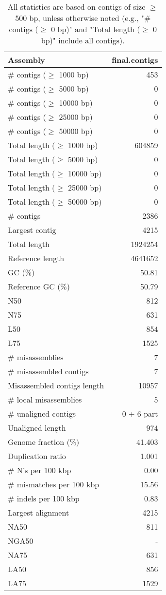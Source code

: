 \documentclass[12pt,a4paper]{article}
\begin{document}
\begin{table}[ht]
\begin{center}
\caption{All statistics are based on contigs of size $\geq$ 500 bp, unless otherwise noted (e.g., "\# contigs ($\geq$ 0 bp)" and "Total length ($\geq$ 0 bp)" include all contigs).}
\begin{tabular}{|l*{1}{|r}|}
\hline
Assembly & final.contigs \\ \hline
\# contigs ($\geq$ 1000 bp) & 453 \\ \hline
\# contigs ($\geq$ 5000 bp) & 0 \\ \hline
\# contigs ($\geq$ 10000 bp) & 0 \\ \hline
\# contigs ($\geq$ 25000 bp) & 0 \\ \hline
\# contigs ($\geq$ 50000 bp) & 0 \\ \hline
Total length ($\geq$ 1000 bp) & 604859 \\ \hline
Total length ($\geq$ 5000 bp) & 0 \\ \hline
Total length ($\geq$ 10000 bp) & 0 \\ \hline
Total length ($\geq$ 25000 bp) & 0 \\ \hline
Total length ($\geq$ 50000 bp) & 0 \\ \hline
\# contigs & 2386 \\ \hline
Largest contig & 4215 \\ \hline
Total length & 1924254 \\ \hline
Reference length & 4641652 \\ \hline
GC (\%) & 50.81 \\ \hline
Reference GC (\%) & 50.79 \\ \hline
N50 & 812 \\ \hline
N75 & 631 \\ \hline
L50 & 854 \\ \hline
L75 & 1525 \\ \hline
\# misassemblies & 7 \\ \hline
\# misassembled contigs & 7 \\ \hline
Misassembled contigs length & 10957 \\ \hline
\# local misassemblies & 5 \\ \hline
\# unaligned contigs & 0 + 6 part \\ \hline
Unaligned length & 974 \\ \hline
Genome fraction (\%) & 41.403 \\ \hline
Duplication ratio & 1.001 \\ \hline
\# N's per 100 kbp & 0.00 \\ \hline
\# mismatches per 100 kbp & 15.56 \\ \hline
\# indels per 100 kbp & 0.83 \\ \hline
Largest alignment & 4215 \\ \hline
NA50 & 811 \\ \hline
NGA50 & - \\ \hline
NA75 & 631 \\ \hline
LA50 & 856 \\ \hline
LA75 & 1529 \\ \hline
\end{tabular}
\end{center}
\end{table}
\end{document}
